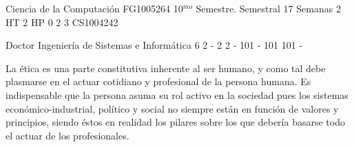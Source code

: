 \documentclass[a4paper,8pt]{article}
\begin{document}
\setNombreProfesor{}
\setGradoProfesorAbreviado{}
\sylabusHeader

\academicaTable
{Ciencia de la Computación} %
{FG1005264} %
{10$^{mo}$ Semestre.} %
{Semestral} %
{17 Semanas} %
{2 HT} %
{2 HP} %
{0} %
{}  %
{2} %
{3} %
{CS1004242} %

\administrativaTable
{Doctor} %
{Ingeniería de Sistemas e Informática} %
{6} %
{2} %
{-} %
{2} %
{2} %
{-} %
{101} %
{-} %
{101} %
{101} %
{-} %


\begin{fundamentacion}
La ética es una parte constitutiva inherente al ser humano, y como tal debe plasmarse en el actuar cotidiano y profesional de la persona humana. Es indispensable que la persona asuma su rol activo en la sociedad pues los sistemas económico-industrial, político y social no siempre están en función de valores y principios, siendo éstos en realidad los pilares sobre los que debería basarse todo el actuar de los profesionales.

\end{fundamentacion}

\begin{sumilla}
\item 
\item 
\item 
\item 

\end{sumilla}

\begin{competenciasAsignatura}
\item {}
\item {}
\item {}
\item {}

\end{competenciasAsignatura}
\end{document}
